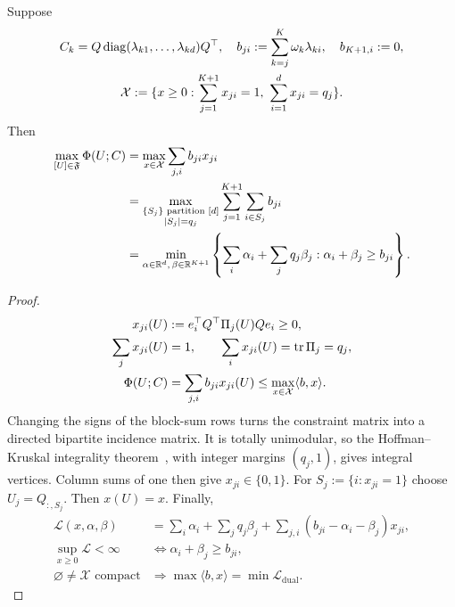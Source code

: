 \begin{theorem}\label{thm:tf-assignment}
Suppose
\begin{gather}
 C_k=Q\operatorname{diag}(\lambda_{k1},\ldots,\lambda_{kd})Q^\top,\quad
 b_{ji}:=\sum_{k=j}^K\omega_k\lambda_{ki},\quad b_{K+1,i}:=0,\\
 \mathcal X:=\{x\ge0:\sum_{j=1}^{K+1}x_{ji}=1,
                    \ \sum_{i=1}^d x_{ji}=q_j\}.
\end{gather}
Then
\begin{align}
 \max_{[U]\in\mathfrak F}\Phi(U;C)
 &=\max_{x\in\mathcal X}\sum_{j,i}b_{ji}x_{ji}\\
 &=\max_{\substack{\{S_j\}\text{ partition }[d]\\ |S_j|=q_j}}
       \sum_{j=1}^{K+1}\sum_{i\in S_j}b_{ji}\\
 &=\min_{\alpha\in\mathbb R^d,\,\beta\in\mathbb R^{K+1}}
       \left\{\sum_i\alpha_i+\sum_jq_j\beta_j:
                    \alpha_i+\beta_j\ge b_{ji}\right\}.
\end{align}
\end{theorem}
\begin{proof}
\begin{align}
 x_{ji}(U)&:=e_i^\top Q^\top\Pi_j(U)Qe_i\ge0,\\
 \sum_jx_{ji}(U)&=1,\qquad \sum_ix_{ji}(U)=\operatorname{tr}\Pi_j=q_j,\\
 \Phi(U;C)&=\sum_{j,i}b_{ji}x_{ji}(U)
 \le\max_{x\in\mathcal X}\langle b,x\rangle.
\end{align}
Changing the signs of the block-sum rows turns the constraint matrix into a
directed bipartite incidence matrix. It is totally unimodular, so the
Hoffman--Kruskal integrality theorem~\citep{hoffman1956integral}, with integer
margins $(q_j,1)$, gives integral vertices. Column sums of one then give
$x_{ji}\in\{0,1\}$. For $S_j:=\{i:x_{ji}=1\}$ choose
$U_j=Q_{:,S_j}$. Then $x(U)=x$. Finally,
\begin{align}
 \mathcal L(x,\alpha,\beta)
 &=\sum_i\alpha_i+\sum_jq_j\beta_j+
       \sum_{j,i}(b_{ji}-\alpha_i-\beta_j)x_{ji},\\
 \sup_{x\ge0}\mathcal L<\infty
 &\Longleftrightarrow\alpha_i+\beta_j\ge b_{ji},\\
 \varnothing\ne\mathcal X\text{ compact}
 &\Longrightarrow\max\langle b,x\rangle=\min\mathcal L_{\mathrm{dual}}.
\end{align}
\end{proof}
